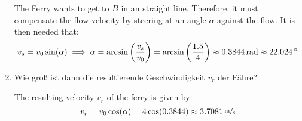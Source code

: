 \begin{ejercicio}[Fährverbindung]
\begin{enumerate}
        The Ferry wants to get to $B$ in an straight line. Therefore, it must compensate the flow velocity by steering at an angle $\alpha$ against the flow. It is then needed that:
        \begin{equation*}
            v_s = v_0 \sin(\alpha) \implies \alpha = \arcsin\left(\frac{v_s}{v_0}\right) = \arcsin\left(\frac{1.5}{4}\right) \approx \unit[0.3844]{rad}
            \approx \unit[22.024]{^\circ}
        \end{equation*}

        \item Wie groß ist dann die resultierende Geschwindigkeit $v_r$ der Fähre?
        
        The resulting velocity $v_r$ of the ferry is given by:
        \begin{equation*}
            v_r = v_0\cos(\alpha) = 4 \cos(0.3844) \approx \unitfrac[3.7081]{m}{s}
        \end{equation*}
    \end{enumerate}
\end{ejercicio}


